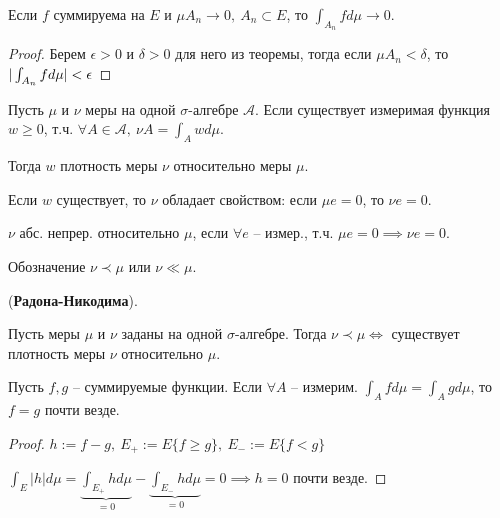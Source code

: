 \begin{consequence}
    Если $f$ суммируема на $E$ и $\mu A_n \rightarrow 0, \ A_n \subset E$, то $\int_{A_n} f d \mu \rightarrow 0$.
\end{consequence}
\begin{proof}
    Берем $\epsilon > 0$ и $\delta > 0$ для него из теоремы, тогда если $\mu A_n < \delta$, то $\\ |\int_{A_n} f d \mu| < \epsilon$
\end{proof}

\begin{definition}
    Пусть $\mu$ и $\nu$ меры на одной $\sigma$-алгебре $\mathcal{A}$. Если существует измеримая функция $w \geq 0$, т.ч. $\forall A \in \mathcal{A}, \ \nu A = \int_{A} w d \mu$.
    
    Тогда $w$ плотность меры $\nu$ относительно меры $\mu$.
\end{definition}

\begin{remark}
    Если $w$ существует, то $\nu$ обладает свойством: если $\mu e = 0$, то $\nu e = 0$.
\end{remark}

\begin{definition}
    $\nu$ абс. непрер. относительно $\mu$, если $\forall e$ -- измер., т.ч. $\mu e = 0 \implies \nu e = 0$.

    Обозначение $\nu \prec \mu$ или $\nu \ll \mu$.
\end{definition}
\begin{theorem}
    (\textbf{Радона-Никодима}).

    Пусть меры $\mu$ и $\nu$ заданы на одной $\sigma$-алгебре. Тогда $\nu \prec \mu \Leftrightarrow $ существует плотность меры $\nu$ относительно $\mu$.
\end{theorem}

\begin{theorem}
    Пусть $f, g$ -- суммируемые функции. Если $\forall A$ -- измерим. $\int_A f d \mu = \int_A g d \mu$,
    то $f = g$ почти везде.
\end{theorem}
\begin{proof}
    $h := f - g, \ E_+ := E \{ f \geq g \}, \ E_- := E \{ f < g \}$

    $\int_E |h| d \mu = \underbrace{\int_{E_+} h d \mu}_{=0} - \underbrace{\int_{E_-} h d \mu}_{=0} = 0 \implies h = 0$ почти везде.
\end{proof}


